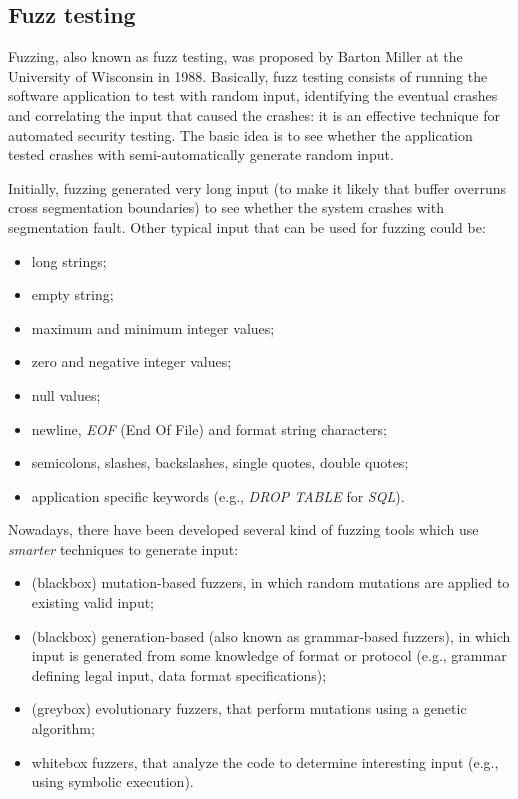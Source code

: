 \subsection{Fuzz testing}
Fuzzing, also known as fuzz testing, was proposed by Barton Miller\parencite{Miller} at the University of Wisconsin in 1988.
Basically, fuzz testing consists of running the software application to test with random input, identifying the eventual crashes and correlating the input that caused the crashes: it is an effective technique for automated security testing.
The basic idea is to see whether the application tested crashes with semi-automatically generate random input.

Initially, fuzzing generated very long input (to make it likely that buffer overruns cross segmentation boundaries) to see whether the system crashes with segmentation fault. Other typical input that can be used for fuzzing could be:
\begin{itemize}[itemsep=1pt]
    \item long strings;
    \item empty string;
    \item maximum and minimum integer values;
    \item zero and negative integer values;
    \item null values;
    \item newline, \textit{EOF} (End Of File) and format string characters;
    \item semicolons, slashes, backslashes, single quotes, double quotes;
    \item application specific keywords (e.g., \textit{DROP TABLE} for \textit{SQL}).
\end{itemize}

Nowadays, there have been developed several kind of fuzzing tools which use \textit{smarter} techniques to generate input:
\begin{itemize}[itemsep=1pt]
    \item (blackbox) mutation-based fuzzers, in which random mutations are applied to existing valid input;
    \item (blackbox) generation-based (also known as grammar-based fuzzers), in which input is generated from some knowledge of format or protocol (e.g., grammar defining legal input, data format specifications);
    \item (greybox) evolutionary fuzzers, that perform mutations using a genetic algorithm;
    \item whitebox fuzzers, that analyze the code to determine interesting input (e.g., using symbolic execution).
\end{itemize}

